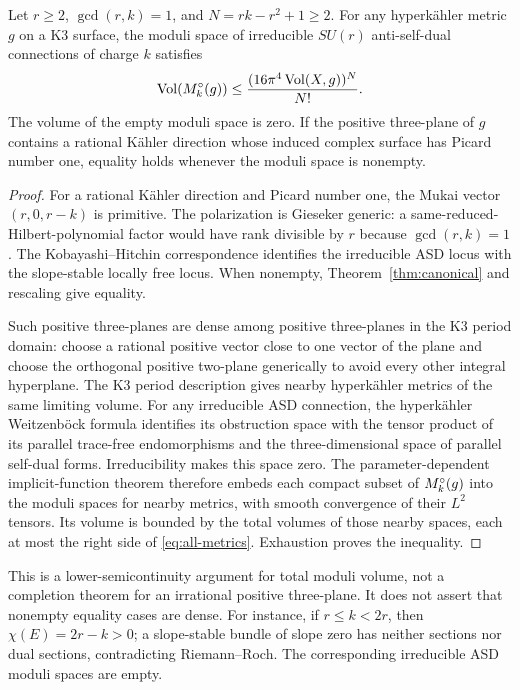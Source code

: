 \begin{proposition}\label{prop:all-metrics}
Let $r\ge2$, $\gcd(r,k)=1$, and $N=rk-r^2+1\ge2$.
For any hyperk\"ahler metric $g$ on a K3 surface, the moduli space of
irreducible $SU(r)$ anti-self-dual connections of charge $k$ satisfies
\begin{equation}\label{eq:all-metrics}
 \operatorname{Vol}(M^{\circ}_k(g))\le\frac{(16\pi^4\operatorname{Vol}(X,g))^N}{N!}.
\end{equation}
The volume of the empty moduli space is zero. If the positive three-plane
of $g$ contains a rational K\"ahler direction whose induced complex
surface has Picard number one, equality holds whenever the moduli space
is nonempty.
\end{proposition}
\begin{proof}
For a rational K\"ahler direction and Picard number one, the Mukai vector
$(r,0,r-k)$ is primitive. The polarization is Gieseker generic: a
same-reduced-Hilbert-polynomial factor would have rank divisible by $r$
because $\gcd(r,k)=1$. The Kobayashi--Hitchin correspondence identifies
the irreducible ASD locus with the slope-stable locally free locus.
When nonempty, Theorem~\ref{thm:canonical} and rescaling give equality.

Such positive three-planes are dense among positive three-planes in the
K3 period domain: choose a rational positive vector close to one vector
of the plane and choose the orthogonal positive two-plane generically to
avoid every other integral hyperplane. The K3 period description gives
nearby hyperk\"ahler metrics of the same limiting volume.
For any irreducible ASD connection, the hyperk\"ahler Weitzenb\"ock formula
identifies its obstruction space with the tensor product of its parallel
trace-free endomorphisms and the three-dimensional space of parallel
self-dual forms. Irreducibility makes this space zero.
The parameter-dependent implicit-function theorem therefore embeds each
compact subset of $M^{\circ}_k(g)$ into the moduli spaces for nearby metrics,
with smooth convergence of their $L^2$ tensors. Its volume is bounded by
the total volumes of those nearby spaces, each at most the right side of
\eqref{eq:all-metrics}. Exhaustion proves the inequality.
\end{proof}

This is a lower-semicontinuity argument for total moduli volume, not a
completion theorem for an irrational positive three-plane. It does not
assert that nonempty equality cases are dense. For instance, if
$r\le k<2r$, then $\chi(E)=2r-k>0$; a slope-stable bundle of slope zero
has neither sections nor dual sections, contradicting Riemann--Roch.
The corresponding irreducible ASD moduli spaces are empty.


